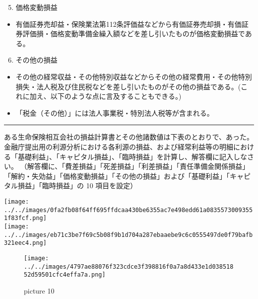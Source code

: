 \documentclass[report,gutter=10mm,fore-edge=10mm,uplatex,dvipdfmx]{jlreq}
\begin{document}
\begin{enumerate}
\setcounter{enumi}{4}
\tightlist
\item
  価格変動損益
\end{enumerate}

\begin{itemize}
\tightlist
\item
  有価証券売却益・保険業法第112条評価益などから有価証券売却損・有価証券評価損・価格変動準備金繰入額などを差し引いたものが価格変動損益である。
\end{itemize}

\begin{enumerate}
\setcounter{enumi}{5}
\tightlist
\item
  その他の損益
\end{enumerate}

\begin{itemize}
\tightlist
\item
  その他の経常収益・その他特別収益などからその他の経常費用・その他特別損失・法人税及び住民税などを差し引いたものがその他の損益である。(これに加え、以下のような点に言及することもできる。)
\item
  「税金（その他）」には法人事業税・特別法人税等が含まれる。
\end{itemize}

\begin{center}\rule{0.5\linewidth}{0.5pt}\end{center}


ある生命保険相互会社の損益計算書とその他諸数値は下表のとおりで、あった。金融庁提出用の利源分析における各利源の損益、および経常利益等の明細における「基礎利益」、「キャピタル損益」、「臨時損益」を計算し、解答欄に記入しなさい。
（解答欄に、「費差損益」「死差損益」「利差損益」「責任準備金関係損益」「解約・失効益」「価格変動損益」「その他の損益」および「基礎利益」「キャピタル損益」「臨時損益」の
10 項目を設定）

\texttt{[image: ../../images/0fa2fb08f64ff695ffdcaa430be6355ac7e498edd61a08355730093551f83fcf.png]}\\
\texttt{[image: ../../images/eb71c3be7f69c5b08f9b1d704a287ebaaebe9c6c0555497de0f79bafb321eec4.png]}


\begin{figure}
\centering
\texttt{[image: ../../images/4797ae88076f323cdce3f398816f0a7a8d433e1d03851852d59501cfc4effa7a.png]}
\caption{picture 10}
\end{figure}
\end{document}

